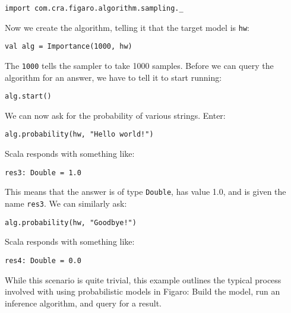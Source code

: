 \begin{flushleft}
\texttt{import com.cra.figaro.algorithm.sampling.\_}
\end{flushleft}

Now we create the algorithm, telling it that the target model is \texttt{hw}:

\begin{flushleft}
\texttt{val alg = Importance(1000, hw)}
\end{flushleft}

The \texttt{1000} tells the sampler to take 1000 samples. Before we can query the algorithm for an answer, we have to tell it to start running:

\begin{flushleft}
\texttt{alg.start()}
\end{flushleft}
We can now ask for the probability of various strings. Enter:

\begin{flushleft}
\texttt{alg.probability(hw, "Hello world!")}
\end{flushleft}
Scala responds with something like:

\begin{flushleft}
\texttt{res3: Double = 1.0}
\end{flushleft}
This means that the answer is of type \texttt{Double}, has value 1.0, and is given the name \texttt{res3}. We can similarly ask:

\begin{flushleft}
\texttt{alg.probability(hw, "Goodbye!")}
\end{flushleft}

Scala responds with something like:

\begin{flushleft}
\texttt{res4: Double = 0.0}
\end{flushleft}

While this scenario is quite trivial, this example outlines the typical process involved with using probabilistic models in Figaro: Build the model, run an inference algorithm, and query for a result.







